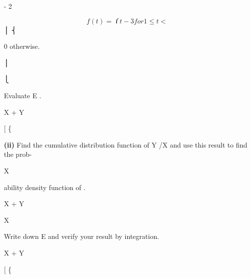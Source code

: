 \documentclass[12pt]{article}
\begin{document}
\begin{flushleft}
- 2\par
\[f(t) = ⎧ t -3 for 1 \leq t <\]
⎪ ⎨ \infty\par
0 otherwise.\par
⎪\par
⎩\par
Evaluate E .\par
X + Y\par
[ \{\par
\textbf{(ii)} Find the cumulative distribution function of Y /X and use this result to find the prob-\par
X\par
ability density function of .\par
X + Y\par
X\par
Write down E and verify your result by integration.\par
X + Y\par
[ \{\par
\end{flushleft}
\end{document}
